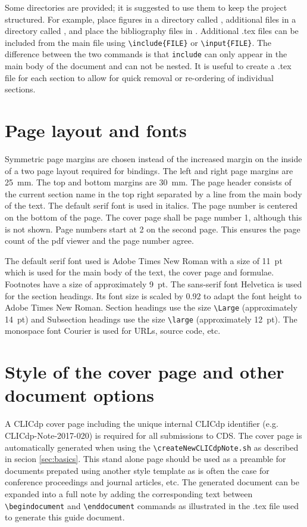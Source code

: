 Some directories are provided; it is suggested to use them to keep the project structured. For example, place figures in a directory called , additional \latex files in a directory called , and place the bibliography files in . Additional .tex files can be included from the main \latex file using \texttt{\textbackslash include\{FILE\}} or \texttt{\textbackslash input\{FILE\}}. The difference between the two commands is that \texttt{include} can only appear in the main body of the document and can not be nested. It is useful to create a .tex file for each section to allow for quick removal or re-ordering of individual sections. 

\section{Page layout and fonts}
\label{sec:layout}
Symmetric page margins are chosen instead of the increased margin on the inside of a two page layout required for bindings. The left and right page margins are \SI{25}{\mm}. The top and bottom margins are \SI{30}{\mm}. The page header consists of the current section name in the top right separated by a line from the main body of the text. The default serif font is used in italics. The page number is centered on the bottom of the page. The cover page shall be page number 1, although this is not shown. Page numbers start at 2 on the second page. This ensures the page count of the pdf viewer and the page number agree.

The default serif font used is Adobe Times New Roman with a size of \SI{11}{pt} which is used for the main body of the text, the cover page and formulae. Footnotes have a size of approximately \SI{9}{pt}. The sans-serif font Helvetica is used for the section headings. Its font size is scaled by \num{0.92} to adapt the font height to Adobe Times New Roman. Section headings use the size \texttt{\textbackslash Large} (approximately \SI{14}{pt}) and Subsection headings use the size \texttt{\textbackslash large} (approximately \SI{12}{pt}). The monospace font Courier is used for URLs, source code, etc.

\section{Style of the cover page and other document options}
\label{sec:title}
A CLICdp cover page including the unique internal CLICdp identifier (e.g. CLICdp-Note-2017-020) is required for all submissions to CDS. The cover page is automatically generated when using the \texttt{\textbackslash createNewCLICdpNote.sh} as described in secion \cref{sec:basics}. This stand alone page should be used as a preamble for documents prepated using another style template as is often the case for conference proceedings and journal articles, etc. The generated document can be expanded into a full note by adding the corresponding text between \texttt{\textbackslash begin{document}} and \texttt{\textbackslash end{document}} commands as illustrated in the .tex file used to generate this guide document.


